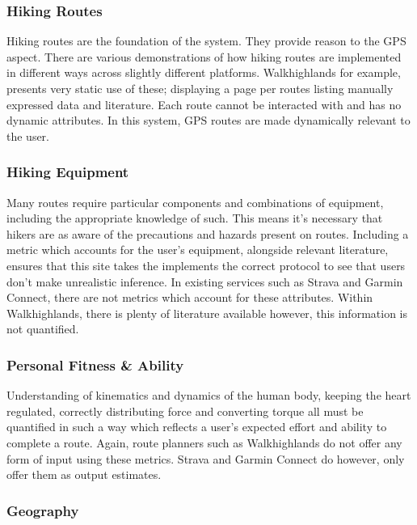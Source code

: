 \documentclass[11pt, english]{article}
\begin{document}
		\subsubsection{Hiking Routes}

		Hiking routes are the foundation of the system. They provide reason to the GPS aspect. There are various demonstrations of how hiking routes are implemented in different ways across slightly different platforms. Walkhighlands for example, presents very static use of these; displaying a page per routes listing manually expressed data and literature. Each route cannot be interacted with and has no dynamic attributes. In this system, GPS routes are made dynamically relevant to the user.

		\subsubsection{Hiking Equipment}

		Many routes require particular components and combinations of equipment, including the appropriate knowledge of such. This means it's necessary that hikers are as aware of the precautions and hazards present on routes. Including a metric which accounts for the user's equipment, alongside relevant literature, ensures that this site takes the implements the correct protocol to see that users don't make unrealistic inference. In existing services such as Strava and Garmin Connect, there are not metrics which account for these attributes. Within Walkhighlands, there is plenty of literature available however, this information is not quantified.

		\subsubsection{Personal Fitness \& Ability}

		Understanding of kinematics and dynamics of the human body, keeping the heart regulated, correctly distributing force and converting torque all must be quantified in such a way which reflects a user's expected effort and ability to complete a route. Again, route planners such as Walkhighlands do not offer any form of input using these metrics. Strava and Garmin Connect do however, only offer them as output estimates.\\

		\subsubsection{Geography}
\end{document}
